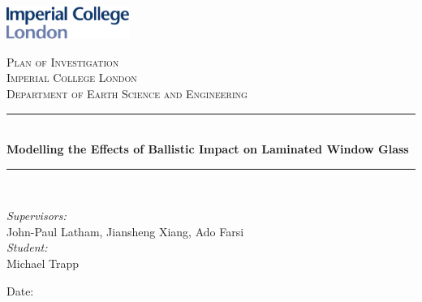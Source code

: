 \documentclass[12pt,twoside]{article}
\newcommand{\reporttitle}{Modelling the Effects of Ballistic Impact on Laminated Window Glass}
\newcommand{\reportauthor}{Michael Trapp}
\newcommand{\reportsupervisors}{John-Paul Latham, Jiansheng Xiang, Ado Farsi}
\newcommand{\reporttype}{\Huge Plan of Investigation}
\theoremstyle{break}
\begin{document}
\begin{titlepage}

\newcommand{\HRule}{\rule{\linewidth}{0.5mm}} %



\includegraphics[width = 4cm]{imperial}\\[0.5cm] 

\begin{center} %

\textsc{\LARGE \reporttype}\\[1.5cm] 
\textsc{\Large Imperial College London}\\[0.5cm] 
\textsc{\large Department of Earth Science and Engineering}\\[0.5cm] 

\HRule \\[0.4cm]
{ \huge \bfseries \reporttitle}\\ %
\HRule \\[1.5cm]
\end{center}

\begin{flushleft} \large
\textit{Supervisors:}\\
\reportsupervisors\\[30pt]
\textit{Student:}\\
\reportauthor %
\end{flushleft}
\vspace{2cm}
\makeatletter
Date: \@date 

\vfill %

\makeatother

\end{titlepage}
\end{document}
